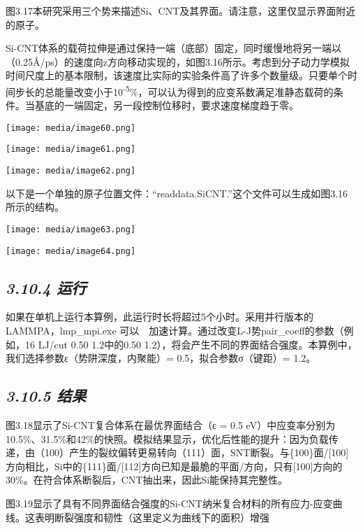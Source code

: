 \documentclass[
]{article}
\begin{document}
图3.17本研究采用三个势来描述Si、CNT及其界面。请注意，这里仅显示界面附近的原子。

Si-CNT体系的载荷拉伸是通过保持一端（底部）固定，同时缓慢地将另一端以（0.25Å/ps）的速度向z方向移动实现的，如图3.16所示。考虑到分子动力学模拟时间尺度上的基本限制，该速度比实际的实验条件高了许多个数量级。只要单个时间步长的总能量改变小于10\textsuperscript{-5}\%，可以认为得到的应变系数满足准静态载荷的条件。当基底的一端固定，另一段控制位移时，要求速度梯度趋于零。

\texttt{[image: media/image60.png]}

\texttt{[image: media/image61.png]}

\texttt{[image: media/image62.png]}

以下是一个单独的原子位置文件：``readdata.SiCNT.''这个文件可以生成如图3.16所示的结构。

\texttt{[image: media/image63.png]}

\texttt{[image: media/image64.png]}

\hypertarget{ux8fd0ux884c-1}{%
\subsection{\texorpdfstring{\emph{3.10.4
运行}}{3.10.4 运行}}\label{ux8fd0ux884c-1}}

如果在单机上运行本算例，此运行时长将超过5个小时。采用并行版本的LAMMPA，lmp\_mpi.exe
可以　加速计算。通过改变L-J势pair\_coeff的参数（例如，16 LJ/cut 0.50
1.2中的0.50
1.2），将会产生不同的界面结合强度。本算例中，我们选择参数ε（势阱深度，内聚能）=
0.5，拟合参数σ（键距）= 1.2。

\hypertarget{ux7ed3ux679c-9}{%
\subsection{\texorpdfstring{\emph{3.10.5
结果}}{3.10.5 结果}}\label{ux7ed3ux679c-9}}

图3.18显示了Si-CNT复合体系在最优界面结合（ε = 0.5
eV）中应变率分别为10.5\%、31.5\%和42\%的快照。模拟结果显示，优化后性能的提升：因为负载传递，由（100）产生的裂纹偏转更易转向（111）面，SNT断裂。与\{100\}面/{[}100{]}方向相比，Si中的\{111\}面/{[}112{]}方向已知是最脆的平面/方向，只有{[}100{]}方向的30\%。在符合体系断裂后，CNT抽出来，因此Si能保持其完整性。

图3.19显示了具有不同界面结合强度的Si-CNT纳米复合材料的所有应力-应变曲线。这表明断裂强度和韧性（这里定义为曲线下的面积）增强
\end{document}
